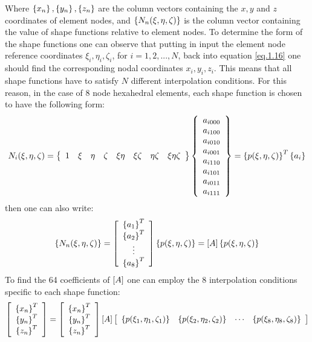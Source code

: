 Where  $\left\lbrace{x_n}\right \rbrace,\left\lbrace{y_n}\right \rbrace,\left\lbrace{z_n}\right \rbrace$ are the column vectors containing the $x,y$ and $z$ coordinates of element nodes, and  $\left\lbrace{N_n(\xi,\eta,\zeta)}\right \rbrace$ is the column vector containing the value of shape functions relative to element nodes. 
To determine the form of the shape functions one can observe that putting in input the element node reference coordinates $\xi_i,\eta_i,\zeta_i$, for $i=1,2,...,N$, back  into equation \eqref{eq.1.16} one should find the corresponding nodal coordinates $x_i,y_i,z_i$. This means that all shape functions have to satisfy $N$ different interpolation conditions. For this reason, in the case of 8 node hexahedral elements, each shape function is chosen to have the following form:
\begin{equation}
N_i(\xi,\eta,\zeta)=\left\lbrace{\begin{array}{cccccccc}
1&\xi&\eta&\zeta&\xi\eta&\xi\zeta&\eta\zeta&\xi\eta\zeta
\end{array}}\right \rbrace\left\lbrace{\begin{array}{c}
a_{i000}\\a_{i100}\\a_{i010}\\a_{i001}\\a_{i110}\\a_{i101}\\a_{i011}\\a_{i111}
\end{array}}\right \rbrace=\left\lbrace{p(\xi,\eta,\zeta)}\right \rbrace^T\left\lbrace{a_i}\right \rbrace
\end{equation}
then one can also write:
\begin{equation}
\left\lbrace{N_n(\xi,\eta,\zeta)}\right \rbrace=\left[{\begin{array}{c}
\left\lbrace{a_1}\right \rbrace^T\\
\left\lbrace{a_2}\right \rbrace^T\\
\vdots\\
\left\lbrace{a_8}\right \rbrace^T
\end{array}}\right]\left\lbrace{p(\xi,\eta,\zeta)}\right \rbrace=\left[{A}\right]\left\lbrace{p(\xi,\eta,\zeta)}\right \rbrace
\end{equation}
To find the 64 coefficients of $\left[{A}\right]$ one can employ the 8 interpolation conditions specific to each shape function:
\begin{equation}
\label{eq1.19}
\left[{\begin{array}{c}\left\lbrace{x_n}\right \rbrace^T\\\left\lbrace{y_n}\right \rbrace^T\\\left\lbrace{z_n}\right \rbrace^T\end{array}}\right]=\left[{\begin{array}{c}\left\lbrace{x_n}\right \rbrace^T\\\left\lbrace{y_n}\right \rbrace^T\\\left\lbrace{z_n}\right \rbrace^T\end{array}}\right]\left[{A}\right]\left[{\begin{array}{cccc}
\left\lbrace{p(\xi_1,\eta_1,\zeta_1)}\right \rbrace&\left\lbrace{p(\xi_2,\eta_2,\zeta_2)}\right \rbrace&\cdots&\left\lbrace{p(\xi_8,\eta_8,\zeta_8)}\right \rbrace
\end{array}}\right]
\end{equation}

